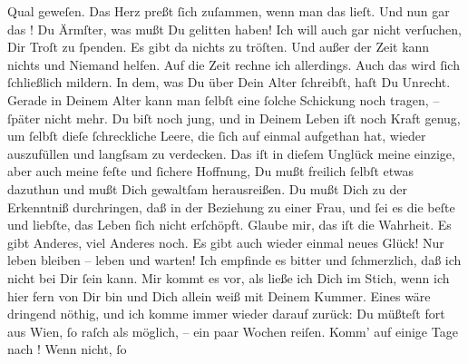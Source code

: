 \begin{ledgroupsized}[t]{13cm}
               Qual geweſen. Das Herz preßt ſich zuſammen, wenn man das lieſt. Und nun gar das
                  \label{K_L02871-4v}\label{K_L02871-4h}! Du
               Ärmſter, was mußt Du gelitten haben! Ich will auch gar nicht verſuchen, Dir Troſt zu
               ſpenden. Es gibt  da nichts zu tröſten. Und außer der Zeit kann nichts und Niemand helfen. Auf
               die Zeit rechne ich allerdings. Auch das wird ſich ſchließlich mildern.  In dem, was Du über {\pb}Dein Alter ſchreibſt,
               haſt Du Unrecht. Gerade in Deinem Alter kann man ſelbſt eine ſolche Schickung noch
               tragen, – ſpäter nicht mehr. Du biſt noch jung, und in Deinem Leben iſt noch Kraft
               genug, um ſelbſt dieſe ſchreckliche Leere, die ſich auf einmal aufgethan hat, wieder
               auszufüllen und \strikeout{\textcolor{gray}{zu}\textcolor{gray}{×}} langſsam \introOben{}zu\introOben{} verdecken. Das iſt \strikeout{\textcolor{gray}{×}} in dieſem Unglück meine einzige, aber auch meine feſte und ſichere Hoffnung,
               Du mußt freilich ſelbſt etwas dazuthun und mußt Dich gewaltſam herausreißen. Du mußt
               Dich zu der Erkenntniß durchringen, daß in der Beziehung zu einer Frau, und ſei es
               die beſte und liebſte, das Leben ſich nicht erſchöpft. Glaube mir, das iſt die
               Wahrheit. Es gibt Anderes, viel Anderes noch. Es gibt auch wieder einmal neues Glück!
               Nur leben bleiben – leben und warten!\pend
           \pstart
           Ich empfinde es bitter und ſchmerzlich, daß ich nicht bei Dir ſein kann. Mir kommt es
               vor, als ließe ich Dich im Stich, wenn ich hier fern von Dir bin und Dich allein weiß
               mit Deinem Kummer. Eines wäre 
               dringend nöthig, und ich komme immer wieder darauf zurück: {\pb}Du müßteſt fort aus Wien, ſo raſch als möglich, – ein paar Wochen reiſen. Komm’ auf einige Tage
               nach \label{K_L02871-5v}\label{K_L02871-5h}! Wenn nicht, ſo

\end{ledgroupsized}
